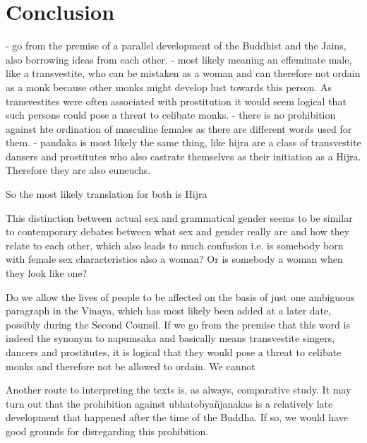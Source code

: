 \section{Conclusion}
- go from the premise of a parallel development of the Buddhist and the Jains, also borrowing ideas from each other.
- most likely meaning an effeminate male, like a transvestite, who can be mistaken as a woman and can therefore not ordain as a monk because other monks might develop lust towards this person. As transvestites were often associated with prostitution it would seem logical that such persons could pose a threat to celibate monks. 
- there is no prohibition against hte ordination of masculine females as there are different words used for them.
- pandaka is most likely the same thing, like hijra are a class of transvestite dansers and prostitutes who also castrate themselves as their initiation as a Hijra. Therefore they are also euneuchs.

So the most likely translation for both is Hijra


This distinction between actual sex and grammatical gender seems to be similar to contemporary debates between what sex and gender really are and how they relate to each other, which also leads to much confusion i.e. is somebody born with female sex characteristics also a woman? Or is somebody a woman when they look like one?


Do we allow the lives of people to be affected on the basis of just one ambiguous paragraph in the Vinaya, which has most likely been added at a later date, possibly during the Second Counsil. If we go from the premise that this word is indeed the synonym to napumsaka and basically means transvestite singers, dancers and prostitutes, it is logical that they would pose a threat to celibate monks and therefore not be allowed to ordain. We cannot 


Another route to interpreting the texts is, as always, comparative study. It may turn out that the prohibition against ubhatobyañjanakas is a relatively late development that happened after the time of the Buddha. If so, we would have good grounds for disregarding this prohibition.